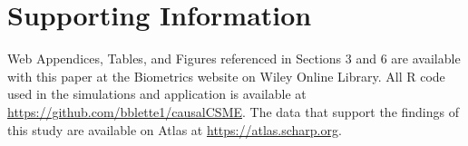\documentclass[useAMS,usenatbib,referee]{biom}
\begin{document}






\section*{Supporting Information}

Web Appendices, Tables, and Figures referenced in Sections 3 and 6 are available with this paper at the Biometrics website on Wiley Online Library. All R code used in the simulations and application is available at \href{https://github.com/bblette1/causalCSME}{https://github.com/bblette1/causalCSME}. The data that support the findings of this study are available on Atlas at \href{https://atlas.scharp.org/cpas/project/HVTN\%20Public\%20Data/HVTN\%20505/begin.view}{https://atlas.scharp.org}.\vspace*{-8pt}

\label{lastpage}
\end{document}
